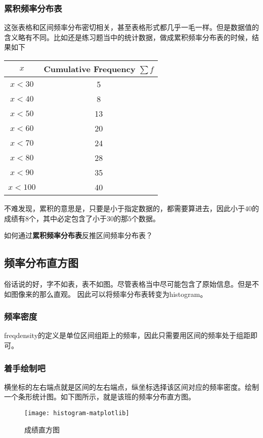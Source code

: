 \subsubsection*{累积频率分布表}
这张表格和区间频率分布密切相关，甚至表格形式都几乎一毛一样。但是数据值的含义略有不同。比如还是练习题当中的统计数据，做成累积频率分布表的时候，结果如下
\begin{table}[H]
\centering
\begin{tabular}{|c|c|}
\hline
$x$                 & Cumulative Frequency $\sum f$ \\ \hline
$x< 30$ & 5             \\ \hline
$x< 40$ & 8              \\ \hline
$x< 50$ & 13             \\ \hline
$x< 60$ & 20              \\ \hline
$x< 70$ & 24            \\ \hline
$x< 80$ & 28              \\ \hline
$x< 90$ & 35             \\ \hline
$x< 100$ & 40              \\ \hline
\end{tabular}
\end{table}

不难发现，累积的意思是，只要是小于指定数据的，都需要算进去，因此小于$40$的成绩有$8$个，其中必定包含了小于$30$的那$5$个数据。

\begin{TaskBox}
如何通过\textbf{累积频率分布表}反推区间频率分布表？
\end{TaskBox}
\clearpage

\subsection*{频率分布直方图}
俗话说的好，字不如表，表不如图。尽管表格当中尽可能包含了原始信息。但是不如图像来的那么直观。
因此可以将频率分布表转变为\gls{histogram}。

\subsubsection*{频率密度}
\gls{freqdensity}的定义是单位区间组距上的频率，因此只需要用区间的频率处于组距即可。

\subsubsection*{着手绘制吧}
横坐标的左右端点就是区间的左右端点，纵坐标选择该区间对应的频率密度。绘制一个条形统计图。如下图所示，就是该班的频率分布直方图。
\begin{figure}[H]
\centering
\texttt{[image: histogram-matplotlib]}
\label{fig:histogram-matplot}
\caption{成绩直方图}
\end{figure}


